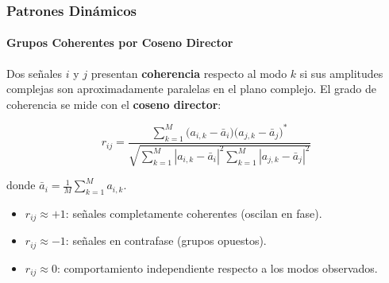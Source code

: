 \documentclass{beamer}
\begin{document}
\begin{frame}
\frametitle{Patrones Dinámicos}
\framesubtitle{Grupos Coherentes por Coseno Director}

Dos señales $i$ y $j$ presentan \textbf{coherencia} respecto al modo $k$
si sus amplitudes complejas son aproximadamente paralelas en el plano complejo.
El grado de coherencia se mide con el \textbf{coseno director}:

\begin{equation}
    r_{ij} =
    \frac{\displaystyle\sum_{k=1}^{M}
          \bigl(a_{i,k} - \bar{a}_i\bigr)\bigl(a_{j,k} - \bar{a}_j\bigr)^*}
         {\sqrt{\displaystyle\sum_{k=1}^{M}|a_{i,k}-\bar{a}_i|^2
                \displaystyle\sum_{k=1}^{M}|a_{j,k}-\bar{a}_j|^2}}
    \label{eq:direction_cosine_art}
\end{equation}

donde $\bar{a}_i = \frac{1}{M}\sum_{k=1}^{M} a_{i,k}$.

\end{frame}


\begin{frame}
    \begin{itemize}
    \item $r_{ij} \approx +1$: señales completamente coherentes (oscilan en fase).
    \item $r_{ij} \approx -1$: señales en contrafase (grupos opuestos).
    \item $r_{ij} \approx 0$: comportamiento independiente respecto a los modos observados.
\end{itemize}
\end{frame}
\end{document}
